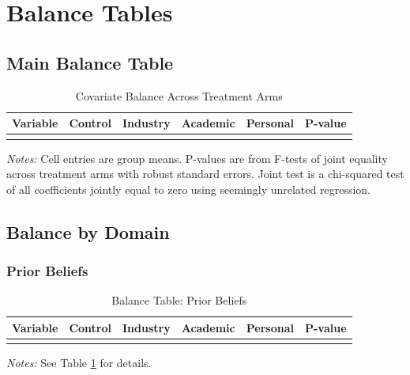 \documentclass[11pt]{article}
\begin{document}
\section{Balance Tables}

\subsection{Main Balance Table}

\begin{table}[H]
\caption{Covariate Balance Across Treatment Arms}
\label{tab:balance_main}
\centering
\begin{tabular}{lccccc}
\toprule
Variable & Control & Industry & Academic & Personal & P-value \\
\midrule

\\
\bottomrule
\end{tabular}
\begin{minipage}{\textwidth}
\vspace{0.5em}
\footnotesize
\textit{Notes:} Cell entries are group means. P-values are from F-tests of joint equality across treatment arms with robust standard errors. Joint test is a chi-squared test of all coefficients jointly equal to zero using seemingly unrelated regression.
\end{minipage}
\end{table}

\subsection{Balance by Domain}

\subsubsection{Prior Beliefs}

\begin{table}[H]
\caption{Balance Table: Prior Beliefs}
\label{tab:balance_prior}
\centering
\begin{tabular}{lccccc}
\toprule
Variable & Control & Industry & Academic & Personal & P-value \\
\midrule

\\
\bottomrule
\end{tabular}
\begin{minipage}{\textwidth}
\vspace{0.5em}
\footnotesize
\textit{Notes:} See Table \ref{tab:balance_main} for details.
\end{minipage}
\end{table}
\end{document}
